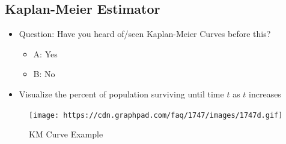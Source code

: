 \documentclass[
]{article}
\providecommand{\tightlist}{%
  \setlength{\itemsep}{0pt}\setlength{\parskip}{0pt}}
\begin{document}
\hypertarget{kaplan-meier-estimator}{%
\subsection{Kaplan-Meier Estimator}\label{kaplan-meier-estimator}}

\begin{itemize}
\tightlist
\item
  Question: Have you heard of/seen Kaplan-Meier Curves before this?

  \begin{itemize}
  \tightlist
  \item
    A: Yes
  \item
    B: No
  \end{itemize}
\item
  Visualize the percent of population surviving until time \(t\) as
  \(t\) increases
\end{itemize}

\begin{figure}
\centering
\texttt{[image: https://cdn.graphpad.com/faq/1747/images/1747d.gif]}
\caption{KM Curve Example}
\end{figure}
\end{document}
